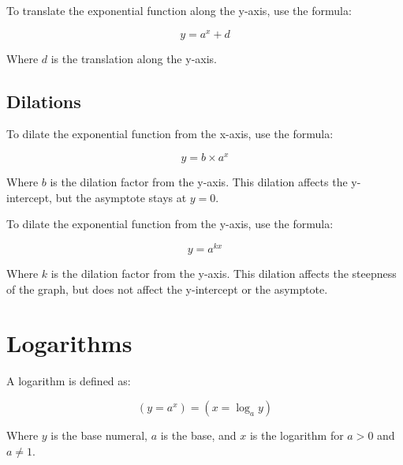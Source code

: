 \documentclass{book}
\begin{document}
To translate the exponential function along the y-axis, use the formula:

\[
	y = a^x + d
\]

Where $d$ is the translation along the y-axis.



\section{Dilations}
To dilate the exponential function from the x-axis, use the formula:

\[
	y = b \times a^x
\]

Where $b$ is the dilation factor from the y-axis.  This dilation affects the y-intercept, but the asymptote stays at $y = 0$.

To dilate the exponential function from the y-axis, use the formula:

\[
	y = a^{kx}
\]

Where $k$ is the dilation factor from the y-axis.  This dilation affects the steepness of the graph, but does not affect the y-intercept or the asymptote.




\chapter{Logarithms}
A logarithm is defined as:

\[
	(y = a^x) = (x = \log_ay)
\]

\begin{center}
\end{center}

Where $y$ is the base numeral, $a$ is the base, and $x$ is the logarithm for $a > 0$ and $a \not = 1$.
\end{document}
